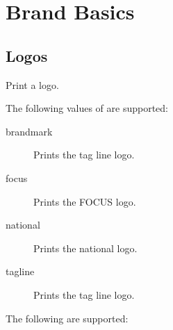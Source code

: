 \documentclass[a4paper]{l3doc}
\begin{document}
\section{Brand Basics}

\subsection{Logos}

\begin{function}{\AFESBrandLogo}
  \begin{syntax}
  \end{syntax}
  Print a logo.
\end{function}

The following values of  are supported:

\begin{description}
  \item[brandmark] Prints the tag line logo.
  \item[focus] Prints the FOCUS logo.
  \item[national] Prints the national logo.
  \item[tagline] Prints the tag line logo.
\end{description}

The following  are supported:
\end{document}

